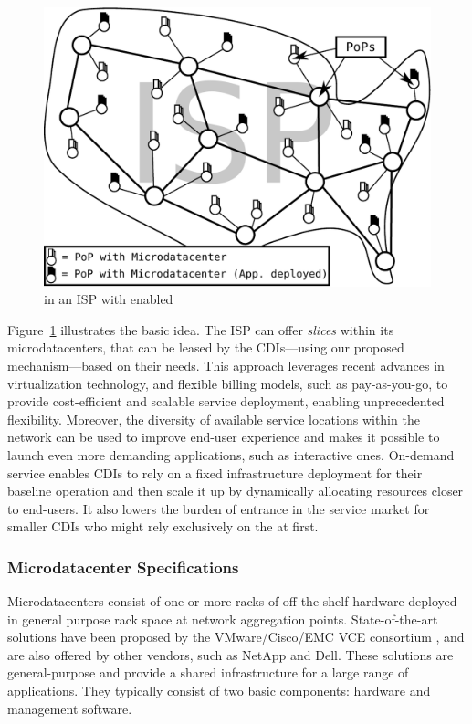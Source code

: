 \begin{figure} 
\begin{center}
	\includegraphics[width=0.9\linewidth]{figures-pdf/ISP+Content} 
\end{center}
\caption{\MDCs in an ISP with \Netpaas enabled} 
\label{fig:story} 
\end{figure}

Figure~\ref{fig:story} illustrates the basic idea. The ISP can offer
\emph{slices} within its microdatacenters, that can be leased by the
CDIs---using our proposed mechanism---based on their needs. This approach
leverages recent advances in virtualization technology, and flexible billing
models, such as pay-as-you-go, to provide cost-efficient and scalable service
deployment, enabling unprecedented flexibility.  Moreover, the diversity of
available service locations within the network can be used to improve end-user
experience and makes it possible to launch even more demanding applications,
such as interactive ones. On-demand service enables CDIs to rely on a fixed
infrastructure deployment for their baseline operation and then scale it up by
dynamically allocating resources closer to end-users. It also lowers the burden
of entrance in the service market for smaller CDIs who might rely exclusively
on the \onservice at first.

\subsubsection{Microdatacenter
Specifications}\label{sec:microdatacenters-specification}

Microdatacenters consist of one or more racks of off-the-shelf hardware
deployed in general purpose rack space at network aggregation points.
State-of-the-art solutions have been proposed by the VMware/Cisco/EMC VCE
consortium \cite{VCE}, and are also offered by other vendors, such as NetApp
and Dell.  These solutions are general-purpose and provide a shared
infrastructure for a large range of applications. They typically consist of two
basic components: hardware and management software.

